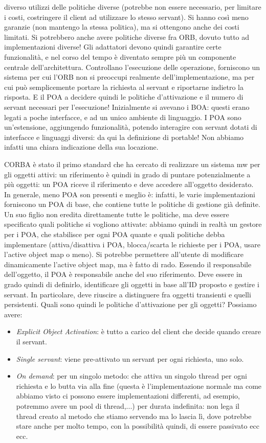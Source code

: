 diverso utilizzi delle politiche diverse (potrebbe non essere necessario, per limitare i costi, costringere il client ad
utilizzare lo stesso servant). Si hanno così meno garanzie (non mantengo la stessa politica), ma si ottengono anche dei
costi limitati. Si potrebbero anche avere politiche diverse fra ORB, dovuto tutto ad implementazioni diverse!
Gli adattatori devono quindi garantire certe funzionalità, e nel corso del tempo è diventato sempre più un componente
centrale dell'architettura. Controllano l'esecuzione delle operazione, forniscono un sistema per cui l'ORB non
si preoccupi realmente dell'implementazione, ma per cui può semplicemente portare la richiesta al servant e riportarne
indietro la risposta. E il POA a decidere quindi le politiche d'attivazione e il numero di servant necessari per
l'esecuzione!
Inizialmente si avevano i BOA: questi erano legati a poche interfacce, e ad un unico ambiente di linguaggio. I POA sono
un'estensione, aggiungendo funzionalità, potendo interagire con servant dotati di interfacce e linguaggi diversi: da
qui la definizione di portable! Non abbiamo infatti una chiara indicazione della sua locazione.

CORBA è stato il primo standard che ha cercato di realizzare un sistema mw per gli oggetti attivi: un riferimento è
quindi in grado di puntare potenzialmente a più oggetti: un POA riceve il riferimento e deve accedere all'oggetto
desiderato. In generale, meno POA son presenti e meglio è: infatti, le varie implementazioni forniscono un POA di base,
che contiene tutte le politiche di gestione già definite. Un suo figlio non eredita direttamente tutte le politiche, ma
deve essere specificato quali politiche si vogliono attivate: abbiamo quindi in realtà un gestore per i POA, che
stabilisce per ogni POA quante e quali politiche debba implementare (attiva/disattiva i POA, blocca/scarta le richieste per i POA, usare l'active object map o meno). Si potrebbe permettere all'utente di modificare dinamicamente l'active object map, ma è fatto di rado.
Essendo il responsabile dell'oggetto, il POA è responsabile anche del suo riferimento. Deve essere in grado quindi di
definirlo, identificare gli oggetti in base all'ID proposto e gestire i servant. In particolare, deve riuscire a
distinguere fra oggetti transienti e quelli persistenti.
Quali sono quindi le politiche d'attivazione per gli oggetti? Possiamo avere:
\begin{itemize}
 \item \textit{Explicit Object Activation}: è tutto a carico del client che decide quando creare il servant.
 \item \textit{Single servant}: viene pre-attivato un servant per ogni richiesta, uno solo.
 \item \textit{On demand}: per un singolo metodo: che attiva un singolo thread per ogni richiesta e lo butta via alla
fine (questa è l'implementazione normale ma come abbiamo visto ci possono essere implementazioni differenti, ad esempio, potremmo avere un pool di thread,...)
per durata indefinita: non lega il thread creato al metodo che stiamo servendo ma lo lascia lì, dove potrebbe stare anche per molto tempo, con la possibilità quindi, di essere passivato ecc ecc.
\end{itemize}
